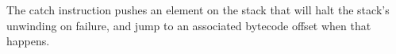 The catch instruction pushes an element on the stack that will halt the
stack's unwinding on failure, and jump to an associated bytecode offset
when that happens.
